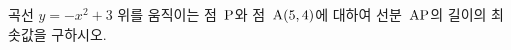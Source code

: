 곡선 $y=-x^2+3$ 위를 움직이는 점~$\mathrm{P}$와 점~$\mathrm{A}(5{,}\mkern3mu\mathopen{}4)$에 대하여 선분~$\mathrm{AP}$의 길이의 최솟값을 구하시오.
